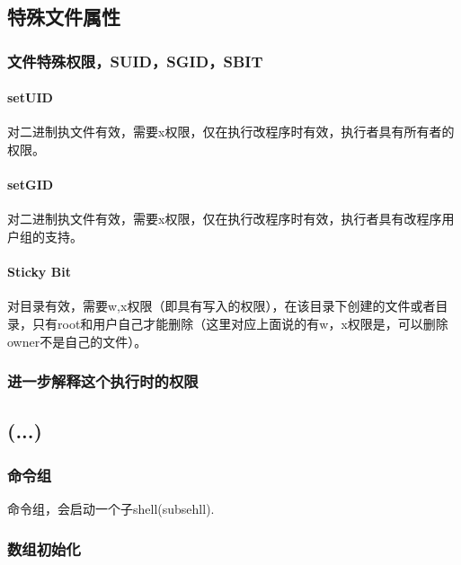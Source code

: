 
\subsection{特殊文件属性}


\subsubsection{文件特殊权限，SUID，SGID，SBIT}

\paragraph{setUID}

对二进制执文件有效，需要x权限，仅在执行改程序时有效，执行者具有所有者的权限。

\paragraph{setGID}

对二进制执文件有效，需要x权限，仅在执行改程序时有效，执行者具有改程序用户组的支持。

\paragraph{Sticky Bit}

对目录有效，需要w,x权限（即具有写入的权限），在该目录下创建的文件或者目录，只有root和用户自己才能删除（这里对应上面说的有w，x权限是，可以删除owner不是自己的文件）。


\subsubsection{进一步解释这个执行时的权限}



\subsection{(...)}

\subsubsection{命令组}

命令组，会启动一个子shell(subsehll).

\subsubsection{数组初始化}





